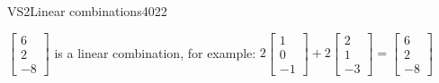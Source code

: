 \begin{exercise}{VS2}{Linear combinations}{4022}
\begin{exerciseAnswer}
\begin{itemize}
 \(\left[\begin{array}{c}
6 \\
2 \\
-8
\end{array}\right]\) is a linear combination, for example: \(
2 \left[\begin{array}{c}
1 \\
0 \\
-1
\end{array}\right] + 2 \left[\begin{array}{c}
2 \\
1 \\
-3
\end{array}\right] = \left[\begin{array}{c}
6 \\
2 \\
-8
\end{array}\right]
                            \) 

 
\end{itemize}

     \end{exerciseAnswer}
 \end{exercise}


